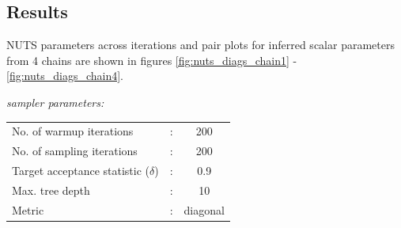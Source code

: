 \documentclass[12pt]{article}
\begin{document}
 \subsection*{Results}
 NUTS parameters across iterations and pair plots for inferred scalar parameters from 4 chains are shown in figures \ref{fig:nuts_diags_chain1} - \ref{fig:nuts_diags_chain4}.

 \textit{sampler parameters:}
 
 \begin{tabular}{lcc}
   No. of warmup iterations & : & 200 \\
   No. of sampling iterations & : & 200 \\
   Target acceptance statistic ($\delta$) & : & 0.9 \\
   Max. tree depth & : & 10 \\
   Metric & : & diagonal \\
 \end{tabular}
 
\end{document}
